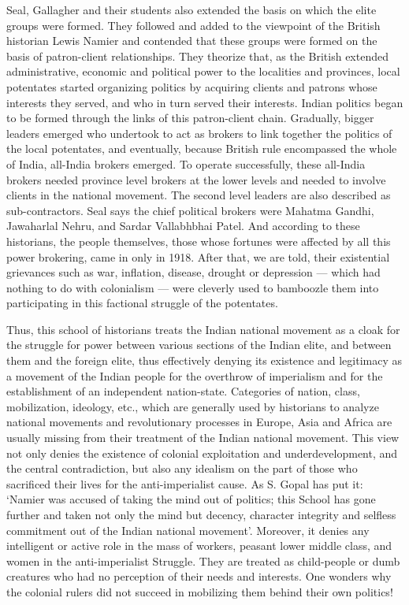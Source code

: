 Seal, Gallagher and their students also extended the basis on which the elite groups were formed. They followed and added to the viewpoint of the British historian Lewis Namier and contended that these groups were formed on the basis of patron-client relationships. They theorize that, as the British extended administrative, economic and political power to the localities and provinces, local potentates started organizing politics by acquiring clients and patrons whose interests they served, and who in turn served their interests. Indian politics began to be formed through the links of this patron-client chain. Gradually, bigger leaders emerged who undertook to act as brokers to link together the politics of the local potentates, and eventually, because British rule encompassed the whole of India, all-India brokers emerged. To operate successfully, these all-India brokers needed province level brokers at the lower levels and needed to involve clients in the national movement. The second level leaders are also described as sub-contractors. Seal says the chief political brokers were Mahatma Gandhi, Jawaharlal Nehru, and Sardar Vallabhbhai Patel. And according to these historians, the people themselves, those whose fortunes were affected by all this power brokering, came in only in 1918. After that, we are told, their existential grievances such as war, inflation, disease, drought or depression — which had nothing to do with colonialism — were cleverly used to bamboozle them into participating in this factional struggle of the potentates.

Thus, this school of historians treats the Indian national movement as a cloak for the struggle for power between various sections of the Indian elite, and between them and the foreign elite, thus effectively denying its existence and legitimacy as a movement of the Indian people for the overthrow of imperialism and for the establishment of an independent nation-state. Categories of nation, class, mobilization, ideology, etc., which are generally used by historians to analyze national movements and revolutionary processes in Europe, Asia and Africa are usually missing from their treatment of the Indian national movement. This view not only denies the existence of colonial exploitation and underdevelopment, and the central contradiction, but also any idealism on the part of those who sacrificed their lives for the anti-imperialist cause. As S. Gopal has put it: `Namier was accused of taking the mind out of politics; this School has gone further and taken not only the mind but decency, character integrity and selfless commitment out of the Indian national movement'. Moreover, it denies any intelligent or active role in the mass of workers, peasant lower middle class, and women in the anti-imperialist Struggle. They are treated as child-people or dumb creatures who had no perception of their needs and interests. One wonders why the colonial rulers did not succeed in mobilizing them behind their own politics!

